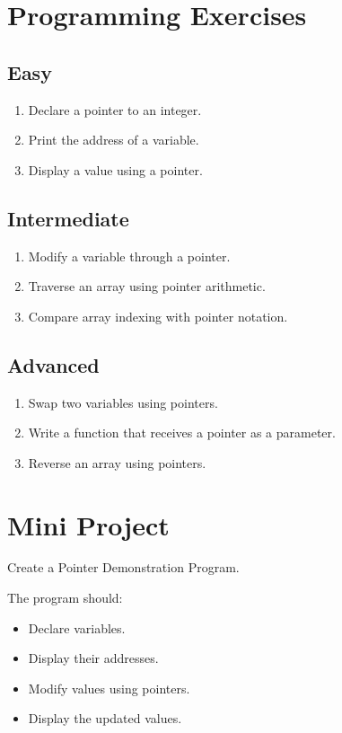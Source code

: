 \documentclass[12pt,openany]{book}
\begin{document}
\section{Programming Exercises}

\subsection*{Easy}

\begin{enumerate}
    \item Declare a pointer to an integer.
    \item Print the address of a variable.
    \item Display a value using a pointer.
\end{enumerate}

\subsection*{Intermediate}

\begin{enumerate}
    \item Modify a variable through a pointer.
    \item Traverse an array using pointer arithmetic.
    \item Compare array indexing with pointer notation.
\end{enumerate}

\subsection*{Advanced}

\begin{enumerate}
    \item Swap two variables using pointers.
    \item Write a function that receives a pointer as a parameter.
    \item Reverse an array using pointers.
\end{enumerate}

\section{Mini Project}

Create a Pointer Demonstration Program.

The program should:

\begin{itemize}
    \item Declare variables.
    \item Display their addresses.
    \item Modify values using pointers.
    \item Display the updated values.
\end{itemize}
\end{document}
